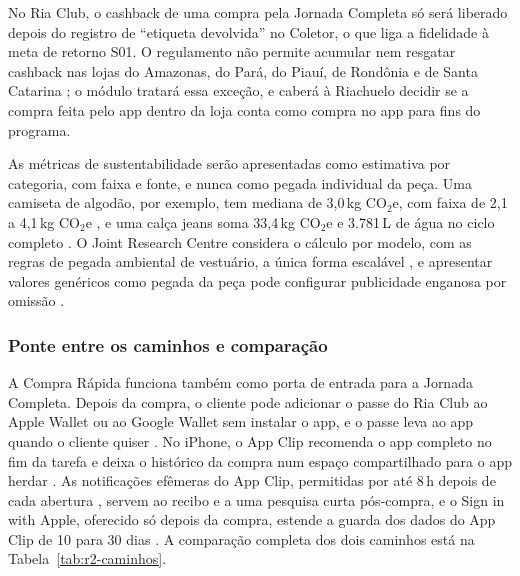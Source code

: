 No Ria Club, o cashback de uma compra pela Jornada Completa só será liberado depois do registro de ``etiqueta devolvida'' no Coletor, o que liga a fidelidade à meta de retorno S01. O regulamento não permite acumular nem resgatar cashback nas lojas do Amazonas, do Pará, do Piauí, de Rondônia e de Santa Catarina \cite{midway2026riaclub}; o módulo tratará essa exceção, e caberá à Riachuelo decidir se a compra feita pelo app dentro da loja conta como compra no app para fins do programa.

As métricas de sustentabilidade serão apresentadas como estimativa por categoria, com faixa e fonte, e nunca como pegada individual da peça. Uma camiseta de algodão, por exemplo, tem mediana de 3,0\,kg CO$_2$e, com faixa de 2,1 a 4,1\,kg CO$_2$e \cite{devera2026camiseta}, e uma calça jeans soma 33,4\,kg CO$_2$e e 3.781\,L de água no ciclo completo \cite{levis2015lca}. O Joint Research Centre considera o cálculo por modelo, com as regras de pegada ambiental de vestuário, a única forma escalável \cite{jrc2026dpp}, e apresentar valores genéricos como pegada da peça pode configurar publicidade enganosa por omissão \cite{brasil1990cdc}.

\subsubsection{Ponte entre os caminhos e comparação}

A Compra Rápida funciona também como porta de entrada para a Jornada Completa. Depois da compra, o cliente pode adicionar o passe do Ria Club ao Apple Wallet ou ao Google Wallet sem instalar o app, e o passe leva ao app quando o cliente quiser \cite{apple2026walletpass,google2026walletfidelidade}. No iPhone, o App Clip recomenda o app completo no fim da tarefa \cite{apple2026appcliphig} e deixa o histórico da compra num espaço compartilhado para o app herdar \cite{apple2026appclipdados}. As notificações efêmeras do App Clip, permitidas por até 8\,h depois de cada abertura \cite{apple2026appclipnotif}, servem ao recibo e a uma pesquisa curta pós-compra, e o Sign in with Apple, oferecido só depois da compra, estende a guarda dos dados do App Clip de 10 para 30 dias \cite{apple2026appclipsuporte}. A comparação completa dos dois caminhos está na Tabela~\ref{tab:r2-caminhos}.

